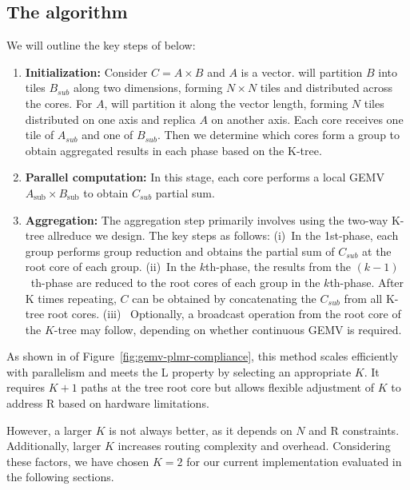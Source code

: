 \subsection{The \gemv algorithm} 

We will outline the key steps of \gemm below:

\begin{enumerate}[label=(\arabic*), leftmargin=0.5cm, noitemsep,topsep=0pt]
\item \textbf{Initialization:} Consider $C = A \times B$ and $A$ is a vector. \gemv will partition $B$ into tiles $B_{sub}$ along two dimensions, forming $N \times N$ tiles and distributed across the cores. For $A$, \gemv will partition it along the vector length, forming $N$ tiles distributed on one axis and replica $A$ on another axis. Each core receives one tile of $A_{sub}$ and one of $B_{sub}$. Then we determine which cores form a group to obtain aggregated results in each phase based on the K-tree.

\item \textbf{Parallel computation:} In this stage, each core performs a local GEMV $A_{\text{sub}} \times B_{\text{sub}}$ to obtain $C_{sub}$ partial sum.

\item \textbf{Aggregation:} The aggregation step primarily involves using the two-way K-tree allreduce we design. The key steps as follows: (i)~In the 1st-phase, each group performs group reduction and obtains the partial sum of $C_{sub}$ at the root core of each group. (ii)~In the $k$th-phase, the results from the $(k-1)$~th-phase are reduced to the root cores of each group in the $k$th-phase. After K times repeating, $C$ can be obtained by concatenating the $C_{sub}$ from all K-tree root cores. (iii)~ Optionally, a broadcast operation from the root core of the $K$-tree may follow, depending on whether continuous GEMV is required.
\end{enumerate}

As shown in  of Figure~\ref{fig:gemv-plmr-compliance}, this method scales efficiently with parallelism and meets the L property by selecting an appropriate $K$. It requires $K+1$ paths at the tree root core but allows flexible adjustment of $K$ to address R based on hardware limitations.  

However, a larger $K$ is not always better, as it depends on $N$ and R constraints. Additionally, larger $K$ increases routing complexity and overhead. Considering these factors, we have chosen $K=2$ for our current implementation evaluated in the following sections.
